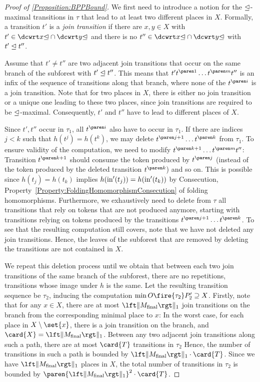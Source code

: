 \documentclass[../../diss.tex]{subfiles}
\begin{document}
\begin{proof}[Proof of \cref{Proposition:BPPBound}]
    We first need to introduce a notion for the $\trianglelefteq$-maximal transitions in $\tau$ that lead to at least two different places in $X$.
    Formally, a transition $t'$ is a \emph{join transition} if there are $x, y\in X$ with $t' \in \causalpredec{x} \cap \causalpredec{y}$ and there is no $t'' \in \causalpredec{x} \cap \causalpredec{y}$ with $t' \trianglelefteq t''$.

    Assume that $t' \neq t''$ are two adjacent join transitions that occur on the same branch of the subforest with $t' \trianglelefteq t''$.
    This means that $t' \itr{t}{1} \ldots \itr{t}{m} t''$ is an infix of the sequence of transitions along that branch, where none of the $\itr{t}{i}$ is a join transition.
    Note that for two places in $X$, there is either no join transition or a unique one leading to these two places, since join transitions are required to be $\trianglelefteq$-maximal.
    Consequently, $t'$ and $t''$ have to lead to different places of $X$.

    Since $t', t''$ occur in $\tau_1$, all $\itr{t}{i}$ also have to occur in $\tau_1$.
    If there are indices $j < k$ such that $h(t^j) = h(t^k)$, we may delete $\itr{t}{j+1} \ldots \itr{t}{k}$ from $\tau_1$.
    To ensure validity of the computation, we need to modify $\itr{t}{k+1} \ldots \itr{t}{m}t''$:
    Transition $\itr{t}{k+1}$ should consume the token produced by $\itr{t}{j}$ (instead of the token produced by the deleted transition $\itr{t}{k}$) and so on.
    This is possible since $h(t_j) = h(t_k)$ implies $h(\text{in}'(t_j)) = h(\text{in}'(t_k))$ by Consecution, Property~\ref{Property:FoldingHomomorphismConsecution} of folding homomorphisms.
    Furthermore, we exhaustively need to delete from $\tau$ all transitions that rely on tokens that are not produced anymore, starting with transitions relying on tokens produced by the transitions $\itr{t}{j+1} \ldots \itr{t}{k}$.
    To see that the resulting computation still covers, note that we have not deleted any join transitions.
    Hence, the leaves of the subforest that are removed by deleting the transitions are not contained in $X$.

    We repeat this deletion process until we obtain that between each two join transitions of the same branch of the subforest, there are no repetitions, \ie transitions whose image under $h$ is the same.
    Let the resulting transition sequence be $\tau_2$, inducing the computation  $\min O \fire{\tau_2} P_2' \supseteq X$.
    Firstly, note that for any $x \in X$, there are at most $\normone{\Mfinal}$ join transitions on the branch from the corresponding minimal place to $x$:
    In the worst case, for each place in $X \setminus \set{x}$, there is a join transition on the branch, and $\card{X} = \normone{\Mfinal}$.
    Between any two adjacent join transitions along such a path, there are at most $\card{T}$ transitions in $\tau_2$
    Hence, the number of transitions in such a path is bounded by $\normone{\Mfinal} \cdot \card{T}$.
    Since we have $\normone{\Mfinal}$ places in $X$, the total number of transitions in $\tau_2$ is bounded by $\paren{\normone{\Mfinal}}^2 \cdot \card{T}$.


\end{proof}
\end{document}
